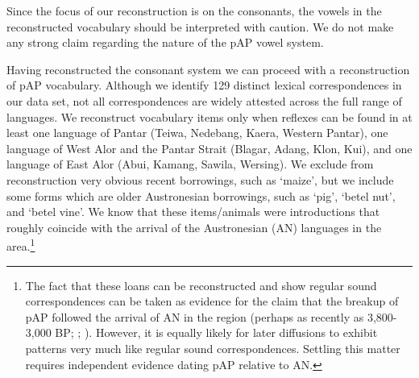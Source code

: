 \addtocounter{footnote}{-3}
Since the focus of our reconstruction is on the consonants, the vowels in the reconstructed vocabulary should be interpreted with caution. We do not make any strong claim regarding the nature of the pAP vowel system.

Having reconstructed the consonant system we can proceed with a reconstruction of pAP vocabulary. Although we identify 129 distinct lexical correspondences in our data set, not all correspondences are widely attested across the full range of languages. We reconstruct vocabulary items only when reflexes can be found in at least one language of Pantar (Teiwa, Nedebang, Kaera, Western Pantar), one language of West Alor and the Pantar Strait (Blagar, Adang, Klon, Kui), and one language of East Alor (Abui, Kamang, Sawila, Wersing). We exclude from reconstruction very obvious recent borrowings, such as `maize', but we include some forms which are older Austronesian borrowings, such as `pig', `betel nut', and `betel vine'. We know that these items/animals were introductions that roughly coincide with the arrival of the Austronesian (AN) languages in the area.\footnote{ The fact that these loans can be reconstructed and show regular sound correspondences can be taken as evidence for the 
claim that the breakup of pAP followed the arrival of AN in the region (perhaps as recently as 3,800-3,000 BP; \citet[511]{Spriggs2011}; \citet[100]{Pawley2005}). However, it is equally likely for later diffusions to exhibit patterns very much like regular sound correspondences. Settling this matter requires independent evidence dating pAP relative to AN.} 

